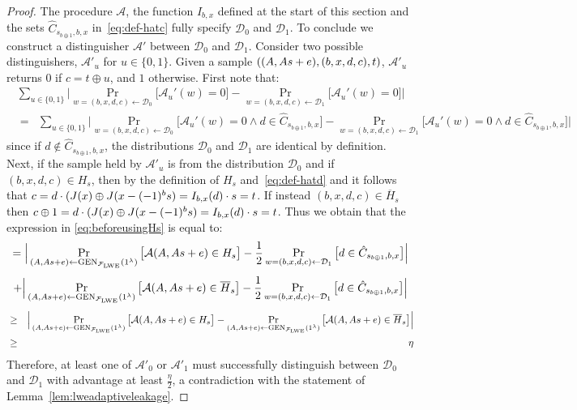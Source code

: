 \begin{proof}
The procedure $\mathcal{A}$, the function $I_{b,x}$ defined at the start of this section and the sets $\hat{C}_{s_{b\oplus 1},b,x}$ in~\eqref{eq:def-hatc} fully specify $\mathcal{D}_0$ and $\mathcal{D}_1$. To conclude we construct a distinguisher $\mathcal{A}'$ between $\mathcal{D}_0$ and $\mathcal{D}_1$. Consider two possible distinguishers, $\mathcal{A}'_u$ for $u\in \{0,1\}$. Given a sample $((\*A,\*A\*s+\*e),(b,x,d,c),t)$, $\mathcal{A}'_u$ returns $0$ if $c=t\oplus u$, and $1$ otherwise. First note that:
\begin{eqnarray}
\sum_{u\in \{0,1\}} \Big|\Pr_{w=(b,x,d,c)\leftarrow \mathcal{D}_0}\big[\mathcal{A}_u'(w)=0\big]-\Pr_{w=(b,x,d,c)\leftarrow \mathcal{D}_1}\big[\mathcal{A}_u'(w)=0\big]\Big|
\end{eqnarray}
\begin{eqnarray}
&=& \sum_{u\in\{0,1\}}\Big|\Pr_{w=(b,x,d,c)\leftarrow \mathcal{D}_0}\big[\mathcal{A}_u'(w)=0 \wedge d\in \hat{C}_{s_{b\oplus 1},b,x} \big]-\Pr_{w=(b,x,d,c)\leftarrow \mathcal{D}_1}\big[\mathcal{A}_u'(w)=0 \wedge d\in \hat{C}_{s_{b\oplus 1},b,x}\big]\Big|\label{eq:beforeusingHs}
\end{eqnarray}
since if $d\notin \hat{C}_{s_{b\oplus 1},b,x}$, the distributions $\mathcal{D}_0$ and $\mathcal{D}_1$ are identical by definition. Next, if the sample held by $\mathcal{A}'_u$ is from the distribution $\mathcal{D}_0$ and if $(b,x,d,c) \in H_s$, then by the definition of $H_s$ and~\eqref{eq:def-hatd} and it follows that $c = d\cdot(\inj(x)\oplus \inj( x - (-1)^b \*s )  = I_{b,x}(d)\cdot s = t$. If instead $(b,x,d,c)\in \overline{H}_s$ then $c\oplus 1 = d\cdot(\inj(x)\oplus \inj( x - (-1)^b \*s ) = I_{b,x}(d)\cdot s = t$.
Thus we obtain that the expression in \eqref{eq:beforeusingHs} is equal to: 
\begin{equation}
= \Big|\Pr_{(\*A,\*A\*s+\*e)\leftarrow \textrm{GEN}_{\mathcal{F}_{\lwe}}(1^{\lambda})}\big[\mathcal{A}(\*A,\*A\*s+\*e) \in H_s\big] -\frac{1}{2}\Pr_{w=(b,x,d,c)\leftarrow \mathcal{D}_1}\big[ d\in \hat{C}_{s_{b\oplus 1},b,x}\big]\Big| 
\end{equation}
\begin{equation}
+ \Big|\Pr_{(\*A,\*A\*s+\*e)\leftarrow \textrm{GEN}_{\mathcal{F}_{\lwe}}(1^{\lambda})}\big[\mathcal{A}(\*A,\*A\*s+\*e) \in \overline{H}_s\big]-\frac{1}{2}\Pr_{w=(b,x,d,c)\leftarrow \mathcal{D}_1}\big[ d\in \hat{C}_{s_{b\oplus 1},b,x}\big]\Big|\\
\end{equation}
\begin{eqnarray}
&\geq& \Big|\Pr_{(\*A,\*A\*s+\*e)\leftarrow \textrm{GEN}_{\mathcal{F}_{\lwe}}(1^{\lambda})}\big[\mathcal{A}(\*A,\*A\*s+\*e) \in H_s\big] - \Pr_{(\*A,\*A\*s+\*e)\leftarrow \textrm{GEN}_{\mathcal{F}_{\lwe}}(1^{\lambda})}\big[\mathcal{A}(\*A,\*A\*s+\*e) \in \overline{H}_s\big]\Big| \\
&\geq& \eta
\end{eqnarray} 
Therefore, at least one of $\mathcal{A}'_0$ or $\mathcal{A}'_1$ must successfully distinguish between $\mathcal{D}_0$ and $\mathcal{D}_1$ with advantage at least $\frac{\eta}{2}$, a contradiction with the statement of Lemma~\ref{lem:lweadaptiveleakage}. 
\end{proof}